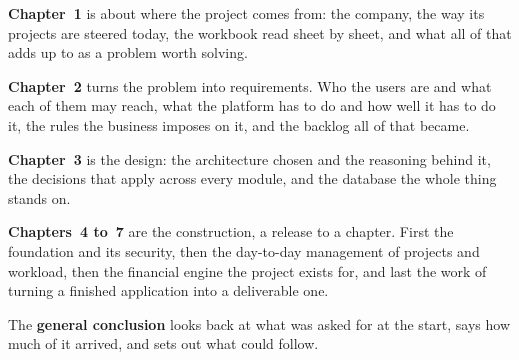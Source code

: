 \textbf{Chapter~1} is about where the project comes from: the company, the way its projects are
steered today, the workbook read sheet by sheet, and what all of that adds up to as a problem
worth solving.

\textbf{Chapter~2} turns the problem into requirements. Who the users are and what each of them
may reach, what the platform has to do and how well it has to do it, the rules the business
imposes on it, and the backlog all of that became.

\textbf{Chapter~3} is the design: the architecture chosen and the reasoning behind it, the
decisions that apply across every module, and the database the whole thing stands on.

\textbf{Chapters~4 to~7} are the construction, a release to a chapter. First the foundation and
its security, then the day-to-day management of projects and workload, then the financial engine
the project exists for, and last the work of turning a finished application into a deliverable
one.

The \textbf{general conclusion} looks back at what was asked for at the start, says how much of it
arrived, and sets out what could follow.
